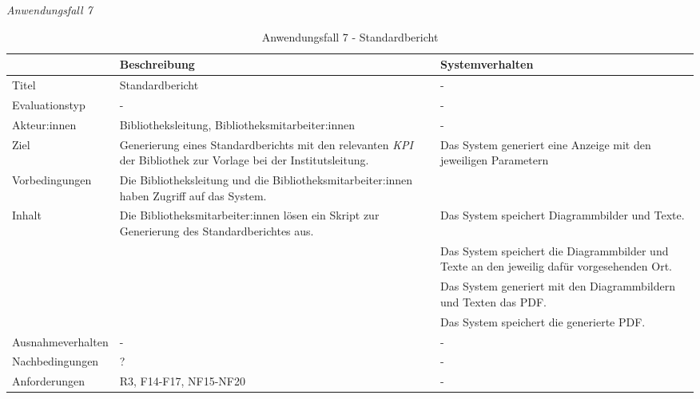 
\newpage
\noindent
\textit{Anwendungsfall 7}

\begingroup
\setlength{\tabcolsep}{10pt} %
\renewcommand{\arraystretch}{1.25} 
\begin{table}[h]
    \centering
    \begin{adjustbox}{max width=\textwidth}
    \begin{tabular}{lp{7.0cm}p{7.0cm}}
       \toprule
       \textbf{}          & \textbf{Beschreibung} &\textbf{Systemverhalten}\\
       \midrule
        Titel                            &Standardbericht& -\\
        Evaluationstyp                   &-                   & -\\
        Akteur:innen                     &Bibliotheksleitung, Bibliotheksmitarbeiter:innen& -\\
        Ziel                             &Generierung eines Standardberichts mit den relevanten \textit{\acrshort{KPI}} der Bibliothek zur Vorlage bei der Institutsleitung. & Das System generiert eine Anzeige mit den jeweiligen Parametern\\
        Vorbedingungen                   &Die Bibliotheksleitung und die Bibliotheksmitarbeiter:innen haben Zugriff auf das System.& \\
        Inhalt                &Die Bibliotheksmitarbeiter:innen lösen ein Skript zur Generierung des Standardberichtes aus.& Das System speichert Diagrammbilder und Texte.\\
        &                                &Das System speichert die Diagrammbilder und Texte an den jeweilig dafür vorgesehenden Ort.\\
        &                                &Das System generiert mit den Diagrammbildern und Texten das PDF.\\
        &                                &Das System speichert die generierte PDF.\\
       
        Ausnahmeverhalten               &- & -\\
        Nachbedingungen                 &?& -\\

        Anforderungen                   &R3, F14-F17, NF15-NF20& -\\
        \bottomrule
    \end{tabular}
    \end{adjustbox}
    \caption{%
    Anwendungsfall 7 - Standardbericht   }
    \label{tab:AF_Standardbericht}
    \end{table}
\endgroup

